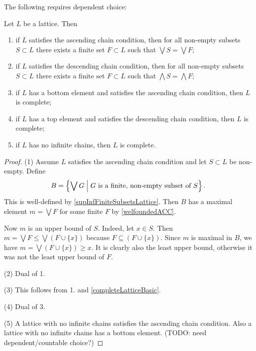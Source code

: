 The following requires dependent choice:
\begin{proposition} \label{ascendingDescendingChainLattice}
Let $L$ be a lattice. Then
\begin{enumerate}
\item if $L$ satisfies the ascending chain condition, then for all non-empty subsets $S\subset L$ there exists a finite set $F\subset L$ such that $\bigvee S = \bigvee F$;
\item if $L$ satisfies the descending chain condition, then for all non-empty subsets $S\subset L$ there exists a finite set $F\subset L$ such that $\bigwedge S = \bigwedge F$;
\item if $L$ has a bottom element and satisfies the ascending chain condition, then $L$ is complete;
\item if $L$ has a top element and satisfies the descending chain condition, then $L$ is complete;
\item if $L$ has no infinite chains, then $L$ is complete.
\end{enumerate}
\end{proposition}
\begin{proof}
(1) Assume $L$ satisfies the ascending chain condition and let $S\subset L$ be non-empty. Define
\[ B = \left\{ \bigvee G \;\middle|\; \text{$G$ is a finite, non-empty subset of $S$} \right\}. \]
This is well-defined by \ref{supInfFiniteSubsetsLattice}. Then $B$ has a maximal element $m = \bigvee F$ for some finite $F$ by \ref{welfoundedACC}.

Now $m$ is an upper bound of $S$. Indeed, let $x\in S$. Then $m= \bigvee F \leq \bigvee (F\cup\{x\})$ because $F\subseteq (F\cup \{x\})$. Since $m$ is maximal in $B$, we have $m = \bigvee (F\cup\{x\}) \geq x$. It is clearly also the least upper bound, otherwise it was not the least upper bound of $F$.

(2) Dual of 1.

(3) This follows from 1. and \ref{completeLatticeBasic}.

(4) Dual of 3.

(5) A lattice with no infinite chains satisfies the ascending chain condition. Also a lattice
with no infinite chains has a bottom element. (TODO: need dependent/countable choice?)
\end{proof}

